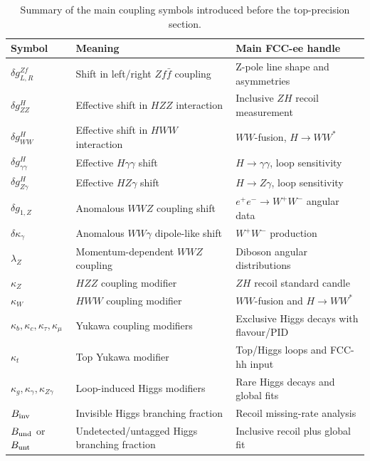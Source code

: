 \documentclass[11pt,a4paper]{report}
\begin{document}
\begin{table}[t]
\centering
\small
\renewcommand{\arraystretch}{1.2}
\caption{Summary of the main coupling symbols introduced before the top-precision section.}
\label{tab:coupling-dictionary-before-top}
\begin{tabular}{lll}
\toprule
\textbf{Symbol} & \textbf{Meaning} & \textbf{Main FCC-ee handle} \\
\midrule
		\(\delta g_{L,R}^{Zf}\) & Shift in left/right \(Zf\bar f\) coupling
		& Z-pole line shape and asymmetries \\
		\(\delta g^H_{ZZ}\) & Effective shift in \(HZZ\) interaction
		& Inclusive \(ZH\) recoil measurement \\
		\(\delta g^H_{WW}\) & Effective shift in \(HWW\) interaction
		& \(WW\)-fusion, \(H\to WW^*\) \\
		\(\delta g^H_{\gamma\gamma}\) & Effective \(H\gamma\gamma\) shift
		& \(H\to\gamma\gamma\), loop sensitivity \\
		\(\delta g^H_{Z\gamma}\) & Effective \(HZ\gamma\) shift
		& \(H\to Z\gamma\), loop sensitivity \\
		\(\delta g_{1,Z}\) & Anomalous \(WWZ\) coupling shift
		& \(e^+e^-\to W^+W^-\) angular data \\
		\(\delta\kappa_\gamma\) & Anomalous \(WW\gamma\) dipole-like shift
		& \(W^+W^-\) production \\
		\(\lambda_Z\) & Momentum-dependent \(WWZ\) coupling
		& Diboson angular distributions \\
		\(\kappa_Z\) & \(HZZ\) coupling modifier
		& \(ZH\) recoil standard candle \\
		\(\kappa_W\) & \(HWW\) coupling modifier
		& \(WW\)-fusion and \(H\to WW^*\) \\
		\(\kappa_b,\kappa_c,\kappa_\tau,\kappa_\mu\)
		& Yukawa coupling modifiers
		& Exclusive Higgs decays with flavour/PID \\
		\(\kappa_t\) & Top Yukawa modifier
		& Top/Higgs loops and FCC-hh input \\
		\(\kappa_g,\kappa_\gamma,\kappa_{Z\gamma}\)
		& Loop-induced Higgs modifiers
		& Rare Higgs decays and global fits \\
		\(B_{\rm inv}\) & Invisible Higgs branching fraction
		& Recoil missing-rate analysis \\
		\(B_{\rm und}\) or \(B_{\rm unt}\) & Undetected/untagged Higgs branching fraction
		& Inclusive recoil plus global fit \\
\bottomrule
\end{tabular}
\end{table}
\end{document}
